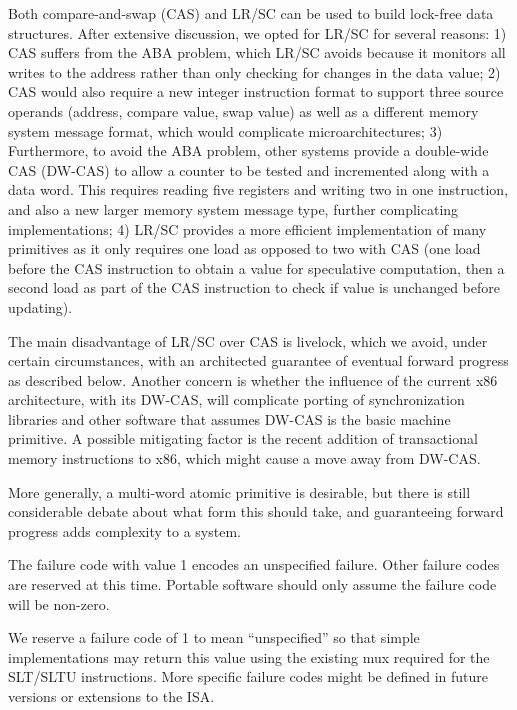 \begin{commentary}
Both compare-and-swap (CAS) and LR/SC can be used to build lock-free
data structures.  After extensive discussion, we opted for LR/SC for
several reasons: 1) CAS suffers from the ABA problem, which LR/SC
avoids because it monitors all writes to the address rather than
only checking for changes in the data value; 2) CAS would also require
a new integer instruction format to support three source operands
(address, compare value, swap value) as well as a different memory
system message format, which would complicate microarchitectures; 3)
Furthermore, to avoid the ABA problem, other systems provide a
double-wide CAS (DW-CAS) to allow a counter to be tested and
incremented along with a data word. This requires reading five
registers and writing two in one instruction, and also a new larger
memory system message type, further complicating implementations; 4)
LR/SC provides a more efficient implementation of many primitives as
it only requires one load as opposed to two with CAS (one load before
the CAS instruction to obtain a value for speculative computation,
then a second load as part of the CAS instruction to check if value is
unchanged before updating).

The main disadvantage of LR/SC over CAS is livelock, which we avoid,
under certain circumstances,
with an architected guarantee of eventual forward progress as
described below.  Another concern is whether the influence of the
current x86 architecture, with its DW-CAS, will complicate porting of
synchronization libraries and other software that assumes DW-CAS is
the basic machine primitive.  A possible mitigating factor is the
recent addition of transactional memory instructions to x86, which
might cause a move away from DW-CAS.

More generally, a multi-word atomic primitive is desirable, but there is
still considerable debate about what form this should take, and
guaranteeing forward progress adds complexity to a system.
\end{commentary}

The failure code with value 1 encodes an unspecified failure.
Other failure codes are reserved at this time.
Portable software should only assume the failure code will be non-zero.

\begin{commentary}
We reserve a failure code of 1 to mean ``unspecified'' so that simple
implementations may return this value using the existing mux required
for the SLT/SLTU instructions.  More specific failure codes might be
defined in future versions or extensions to the ISA.
\end{commentary}

